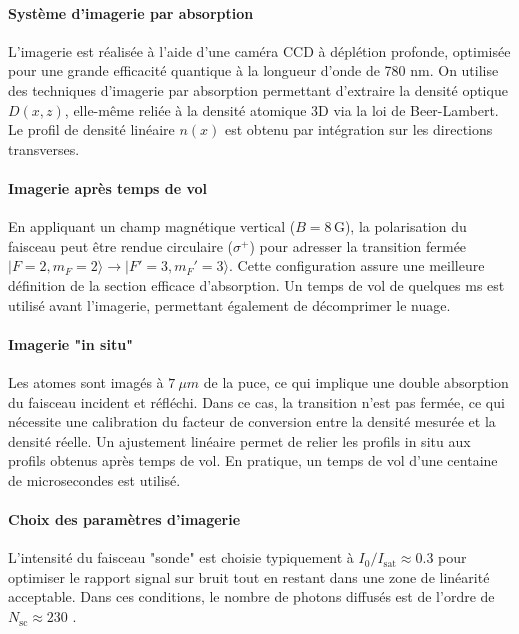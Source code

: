 \paragraph{Système d’imagerie par absorption}

L’imagerie est réalisée à l’aide d’une caméra \gls{CCD} à déplétion profonde, optimisée pour une grande efficacité quantique à la longueur d’onde de 780 nm. On utilise des techniques d’imagerie par absorption permettant d’extraire la densité optique \( D(x, z) \), elle-même reliée à la densité atomique 3D via la loi de Beer-Lambert. Le profil de densité linéaire \( n(x) \) est obtenu par intégration sur les directions transverses.

\paragraph{Imagerie après temps de vol}

En appliquant un champ magnétique vertical (\( B = 8\,\mathrm{G} \)), la polarisation du faisceau peut être rendue circulaire (\( \sigma^+ \)) pour adresser la transition fermée \( |F=2, m_F=2\rangle \rightarrow |F'=3, m_F'=3\rangle \). Cette configuration assure une meilleure définition de la section efficace d’absorption. Un temps de vol de quelques ms est utilisé avant l’imagerie, permettant également de décomprimer le nuage.

\paragraph{Imagerie "in situ"}
Les atomes sont imagés à $7~\mu m$ de la puce, ce qui implique une double absorption du faisceau incident et réfléchi. Dans ce cas, la transition n’est pas fermée, ce qui nécessite une calibration du facteur de conversion entre la densité mesurée et la densité réelle. Un ajustement linéaire permet de relier les profils in situ aux profils obtenus après temps de vol. En pratique, un temps de vol d’une centaine de microsecondes est utilisé. 

\paragraph{Choix des paramètres d’imagerie}

L’intensité du faisceau "sonde" est choisie typiquement à \( I_0/I_{\mathrm{sat}} \approx 0.3 \) pour optimiser le rapport signal sur bruit tout en restant dans une zone de linéarité acceptable. Dans ces conditions, le nombre de photons diffusés est de l’ordre de \( N_{\mathrm{sc}} \approx 230 \) .%

